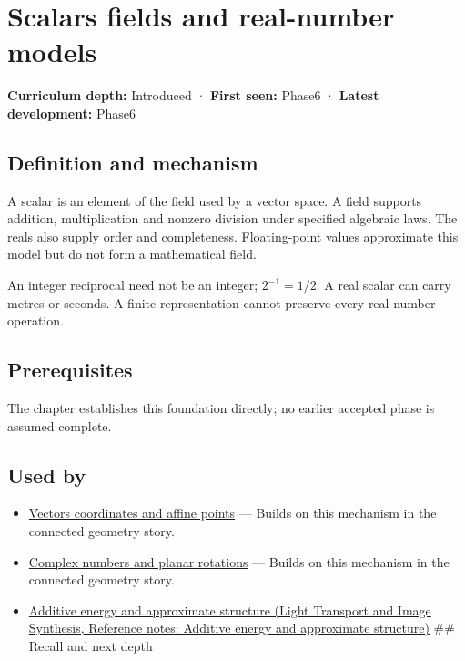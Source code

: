 \hypertarget{appendix-52051ad550fe}{}\label{referencestart:appendix-52051ad550fe}
\section{Scalars fields and real-number models}\label{appendix-52051ad550fe-scalars-fields-and-real-number-models}

\textbf{Curriculum depth:} Introduced · \textbf{First seen:} Phase6 · \textbf{Latest development:} Phase6

\begin{allmightroledefinition}

\subsection{Definition and mechanism}\label{appendix-52051ad550fe-definition-and-mechanism}

A scalar is an element of the field used by a vector space. A field supports addition, multiplication and nonzero division under specified algebraic laws. The reals also supply order and completeness. Floating-point values approximate this model but do not form a mathematical field.

\end{allmightroledefinition}

An integer reciprocal need not be an integer; \(2^{-1}=1/2\). A real scalar can carry metres or seconds. A finite representation cannot preserve every real-number operation.

\subsection{Prerequisites}\label{appendix-52051ad550fe-prerequisites}

The chapter establishes this foundation directly; no earlier accepted phase is assumed complete.

\subsection{Used by}\label{appendix-52051ad550fe-used-by}

\begin{itemize}
\item
  \hyperref[appendix-0659864c0aa3]{Vectors coordinates and affine points} --- Builds on this mechanism in the connected geometry story.
\item
  \hyperref[appendix-f77eadcc4a93]{Complex numbers and planar rotations} --- Builds on this mechanism in the connected geometry story.
\item
  \href{../04-Light-Transport-and-Image-Synthesis/main.pdf\#nameddest=appendix-b0732b22e7d6}{Additive energy and approximate structure (Light Transport and Image Synthesis, Reference notes: Additive energy and approximate structure)} \#\# Recall and next depth
\end{itemize}

